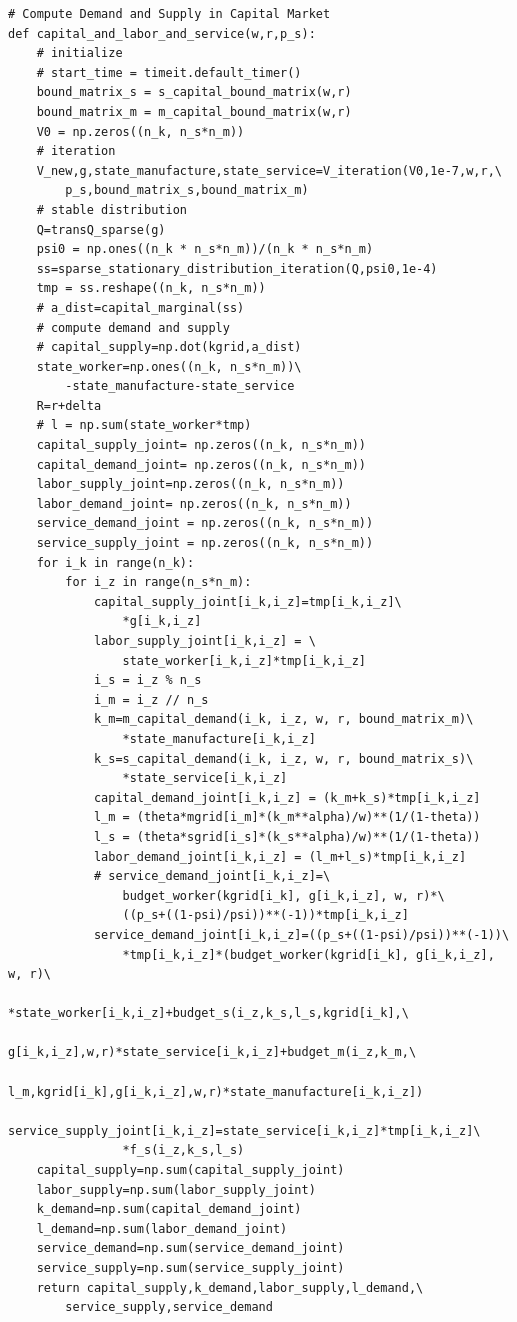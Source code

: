 \documentclass[a4paper, 12pt]{ctexart}
\begin{document}
\begin{lstlisting}
# Compute Demand and Supply in Capital Market
def capital_and_labor_and_service(w,r,p_s):
    # initialize
    # start_time = timeit.default_timer()
    bound_matrix_s = s_capital_bound_matrix(w,r)
    bound_matrix_m = m_capital_bound_matrix(w,r)
    V0 = np.zeros((n_k, n_s*n_m))
    # iteration
    V_new,g,state_manufacture,state_service=V_iteration(V0,1e-7,w,r,\
        p_s,bound_matrix_s,bound_matrix_m)
    # stable distribution
    Q=transQ_sparse(g)
    psi0 = np.ones((n_k * n_s*n_m))/(n_k * n_s*n_m)
    ss=sparse_stationary_distribution_iteration(Q,psi0,1e-4)
    tmp = ss.reshape((n_k, n_s*n_m))
    # a_dist=capital_marginal(ss)
    # compute demand and supply
    # capital_supply=np.dot(kgrid,a_dist)
    state_worker=np.ones((n_k, n_s*n_m))\
        -state_manufacture-state_service
    R=r+delta
    # l = np.sum(state_worker*tmp)
    capital_supply_joint= np.zeros((n_k, n_s*n_m))
    capital_demand_joint= np.zeros((n_k, n_s*n_m))
    labor_supply_joint=np.zeros((n_k, n_s*n_m))
    labor_demand_joint= np.zeros((n_k, n_s*n_m))
    service_demand_joint = np.zeros((n_k, n_s*n_m))
    service_supply_joint = np.zeros((n_k, n_s*n_m))
    for i_k in range(n_k):
        for i_z in range(n_s*n_m):
            capital_supply_joint[i_k,i_z]=tmp[i_k,i_z]\
                *g[i_k,i_z]
            labor_supply_joint[i_k,i_z] = \
                state_worker[i_k,i_z]*tmp[i_k,i_z]
            i_s = i_z % n_s
            i_m = i_z // n_s
            k_m=m_capital_demand(i_k, i_z, w, r, bound_matrix_m)\
                *state_manufacture[i_k,i_z]
            k_s=s_capital_demand(i_k, i_z, w, r, bound_matrix_s)\
                *state_service[i_k,i_z]
            capital_demand_joint[i_k,i_z] = (k_m+k_s)*tmp[i_k,i_z]
            l_m = (theta*mgrid[i_m]*(k_m**alpha)/w)**(1/(1-theta))
            l_s = (theta*sgrid[i_s]*(k_s**alpha)/w)**(1/(1-theta))
            labor_demand_joint[i_k,i_z] = (l_m+l_s)*tmp[i_k,i_z]
            # service_demand_joint[i_k,i_z]=\
                budget_worker(kgrid[i_k], g[i_k,i_z], w, r)*\
                ((p_s+((1-psi)/psi))**(-1))*tmp[i_k,i_z]
            service_demand_joint[i_k,i_z]=((p_s+((1-psi)/psi))**(-1))\
                *tmp[i_k,i_z]*(budget_worker(kgrid[i_k], g[i_k,i_z], w, r)\
                *state_worker[i_k,i_z]+budget_s(i_z,k_s,l_s,kgrid[i_k],\
                g[i_k,i_z],w,r)*state_service[i_k,i_z]+budget_m(i_z,k_m,\
                l_m,kgrid[i_k],g[i_k,i_z],w,r)*state_manufacture[i_k,i_z])
            service_supply_joint[i_k,i_z]=state_service[i_k,i_z]*tmp[i_k,i_z]\
                *f_s(i_z,k_s,l_s)
    capital_supply=np.sum(capital_supply_joint)
    labor_supply=np.sum(labor_supply_joint)
    k_demand=np.sum(capital_demand_joint)
    l_demand=np.sum(labor_demand_joint)
    service_demand=np.sum(service_demand_joint)
    service_supply=np.sum(service_supply_joint)
    return capital_supply,k_demand,labor_supply,l_demand,\
        service_supply,service_demand
\end{lstlisting}
\end{document}
